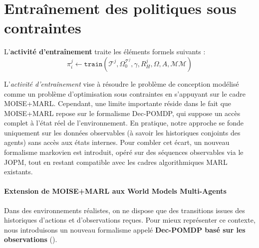 \chapter{Entraînement des politiques sous contraintes}
\label{chap:training}

L'\textbf{activité d'entraînement} traite les éléments formels suivants :
%
\begin{displaymath}
    \pi^j_i \gets \texttt{train}(\mathcal{T}^j, \Omega^{\mathcal{T}^j}_0, \gamma, R^j_H, \Omega, A, \mathcal{MM})
\end{displaymath}

L'\textit{activité d'entraînement} vise à résoudre le problème de conception modélisé comme un problème d'optimisation sous contraintes en s'appuyant sur le cadre MOISE+MARL. Cependant, une limite importante réside dans le fait que MOISE+MARL repose sur le formalisme \ac{Dec-POMDP}, qui suppose un accès complet à l'état réel de l'environnement. En pratique, notre approche se fonde uniquement sur les données observables (à savoir les historiques conjoints des agents) sans accès aux états internes. Pour combler cet écart, un nouveau formalisme markovien est introduit, opéré sur des séquences observables via le \ac{JOPM}, tout en restant compatible avec les cadres algorithmiques \ac{MARL} existants.

\subsubsection{Extension de MOISE+MARL aux World Models Multi-Agents}

\noindent Dans des environnements réalistes, on ne dispose que des transitions issues des historiques d'actions et d'observations reçues. Pour mieux représenter ce contexte, nous introduisons un nouveau formalisme appelé \textbf{Dec-POMDP basé sur les observations} ().

